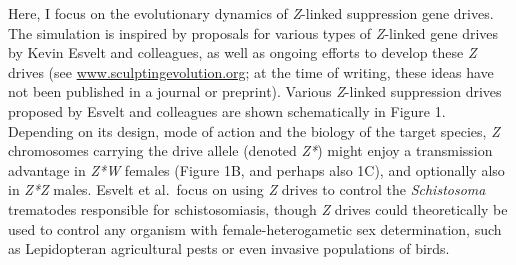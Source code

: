 \documentclass[]{rsos}%
\begin{document}
Here, I focus on the evolutionary dynamics of \emph{Z}-linked
suppression gene drives. The simulation is inspired by proposals for
various types of \emph{Z}-linked gene drives by Kevin Esvelt and
colleagues, as well as ongoing efforts to develop these \emph{Z} drives
(see \href{}{www.sculptingevolution.org}; at the time of writing, these
ideas have not been published in a journal or preprint). Various
\emph{Z}-linked suppression drives proposed by Esvelt and colleagues are
shown schematically in Figure 1. Depending on its design, mode of action
and the biology of the target species, \emph{Z} chromosomes carrying the
drive allele (denoted \emph{Z*}) might enjoy a transmission advantage in
\emph{Z*W} females (Figure 1B, and perhaps also 1C), and optionally also
in \emph{Z*Z} males. Esvelt et al.~focus on using \emph{Z} drives to
control the \emph{Schistosoma} trematodes responsible for
schistosomiasis, though \emph{Z} drives could theoretically be used to
control any organism with female-heterogametic sex determination, such
as Lepidopteran agricultural pests or even invasive populations of
birds.
\end{document}
